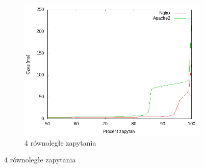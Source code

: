 \begin{figure}
\begin{subfigure}[h]{0.3\textwidth}
		\includegraphics[width=\textwidth]{testy/wybor_index_duzy_4.png}
		\caption{4 równoległe zapytania}
	\end{subfigure}


\end{figure}
